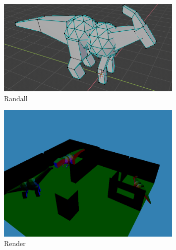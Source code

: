 \documentclass{article}[12pt]
\begin{document}
\begin{figure}[!ht]
        \centering
        \includegraphics[width=0.8\textwidth]{bob.png}
        \caption{Randall}
\end{figure}

\begin{figure}[!ht]
        \centering
        \includegraphics[width=0.8\textwidth]{render.png}
        \caption{Render}
\end{figure}
\end{document}
